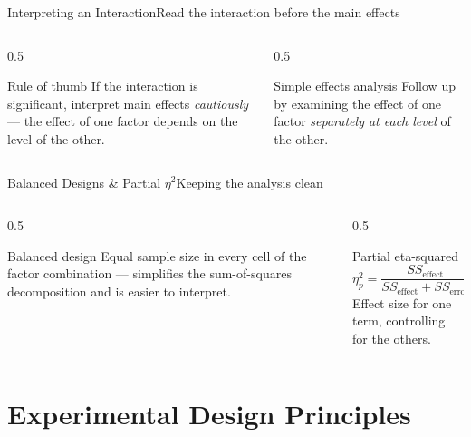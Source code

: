 \documentclass[aspectratio=169,11pt]{beamer}
\begin{document}
\begin{frame}{Interpreting an Interaction}{Read the interaction before the main effects}
  \begin{columns}[T]
    \begin{column}{0.5\textwidth}
      \begin{block}{Rule of thumb}
        \small If the interaction is significant, interpret main effects
        \emph{cautiously} — the effect of one factor depends on the level
        of the other.
      \end{block}
    \end{column}
    \begin{column}{0.5\textwidth}
      \begin{exampleblock}{Simple effects analysis}
        \small Follow up by examining the effect of one factor
        \emph{separately at each level} of the other.
      \end{exampleblock}
    \end{column}
  \end{columns}
\end{frame}

\begin{frame}{Balanced Designs \& Partial $\eta^2$}{Keeping the analysis clean}
  \begin{columns}[T]
    \begin{column}{0.5\textwidth}
      \begin{block}{Balanced design}
        \small Equal sample size in every cell of the factor combination —
        simplifies the sum-of-squares decomposition and is easier to
        interpret.
      \end{block}
    \end{column}
    \begin{column}{0.5\textwidth}
      \begin{exampleblock}{Partial eta-squared}
        \[ \eta_p^2 = \frac{SS_{\text{effect}}}{SS_{\text{effect}}+SS_{\text{error}}} \]
        \small Effect size for one term, controlling for the others.
      \end{exampleblock}
    \end{column}
  \end{columns}
\end{frame}

\section{Experimental Design Principles}
\end{document}

